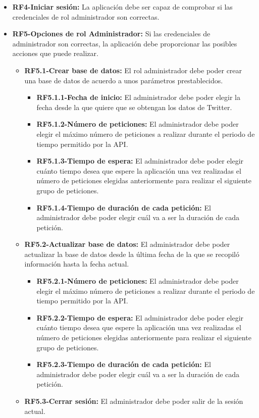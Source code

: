 \begin{itemize}
\begin{itemize}
\begin{itemize}
        \end{itemize}
    \end{itemize}
    \item \textbf{RF4-Iniciar sesión:} La aplicación debe ser capaz de comprobar si las credenciales de rol administrador son correctas.
    \item \textbf{RF5-Opciones de rol Administrador:} Si las credenciales de
administrador son correctas, la aplicación debe proporcionar las posibles acciones que puede realizar.
    \begin{itemize}
        \item \textbf{RF5.1-Crear base de datos:} El rol administrador debe poder crear una base de datos de acuerdo a unos parámetros prestablecidos.
        \begin{itemize}
            \item \textbf{RF5.1.1-Fecha de inicio:} El administrador debe poder elegir la fecha desde la que quiere que se obtengan los datos de Twitter.
            \item \textbf{RF5.1.2-Número de peticiones:} El administrador debe poder elegir el máximo número de peticiones a realizar durante el periodo de tiempo permitido por la API.
            \item \textbf{RF5.1.3-Tiempo de espera:} El administrador debe poder elegir cuánto tiempo desea que espere la aplicación una vez realizadas el número de peticiones elegidas anteriormente para realizar el siguiente grupo de peticiones.
            \item \textbf{RF5.1.4-Tiempo de duración de cada petición:} El administrador debe poder elegir cuál va a ser la duración de cada petición.
        \end{itemize}
        \item \textbf{RF5.2-Actualizar base de datos:} El administrador debe poder actualizar la base de datos desde la última fecha de la que se recopiló información hasta la fecha actual.
        \begin{itemize}
            \item \textbf{RF5.2.1-Número de peticiones:} El administrador debe poder elegir el máximo número de peticiones a realizar durante el periodo de tiempo permitido por la API.
            \item \textbf{RF5.2.2-Tiempo de espera:} El administrador debe poder elegir cuánto tiempo desea que espere la aplicación una vez realizadas el número de peticiones elegidas anteriormente para realizar el siguiente grupo de peticiones.
            \item \textbf{RF5.2.3-Tiempo de duración de cada petición:} El administrador debe poder elegir cuál va a ser la duración de cada petición.
        \end{itemize}
        \item \textbf{RF5.3-Cerrar sesión:} El administrador debe poder salir de la sesión actual.
    \end{itemize}
\end{itemize}
